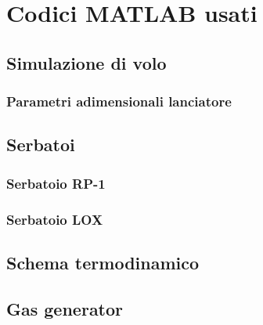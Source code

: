\section{Codici MATLAB usati}
\label{appendix:codici}

\subsection{Simulazione di volo}



\subsubsection{Parametri adimensionali lanciatore}



\subsection{Serbatoi}

\subsubsection{Serbatoio RP-1}


\subsubsection{Serbatoio LOX}


\subsection{Schema termodinamico}


\subsection{Gas generator}


